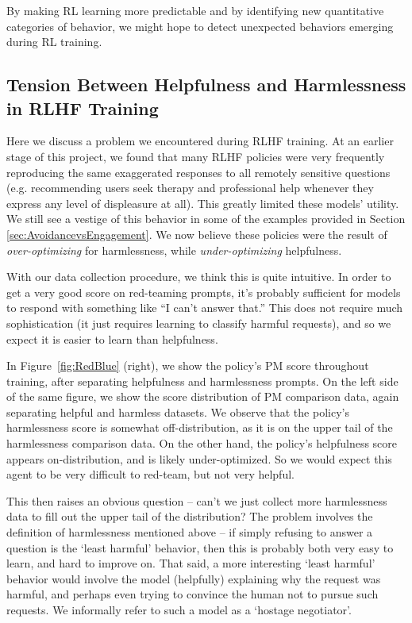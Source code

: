 By making RL learning more predictable and by identifying new quantitative categories of behavior, we might hope to detect unexpected behaviors emerging during RL training.  

\subsection{Tension Between Helpfulness and Harmlessness in RLHF Training}
\label{sec:RedBlue}

Here we discuss a problem we encountered during RLHF training.  At an earlier stage of this project, we found that many RLHF policies were very frequently reproducing the same exaggerated responses to all remotely sensitive questions (e.g. recommending users seek therapy and professional help whenever they express any level of displeasure at all). This greatly limited these models' utility.  We  still see a vestige of this behavior in some of the examples provided in Section \ref{sec:AvoidancevsEngagement}.  We now believe these policies were the result of {\it over-optimizing} for harmlessness, while {\it under-optimizing} helpfulness.  

With our data collection procedure, we think this is quite intuitive.  In order to get a very good score on red-teaming prompts, it's probably sufficient for models to respond with something like ``I can't answer that.'' This does not require much sophistication (it just requires learning to classify harmful requests), and so we expect it is easier to learn than helpfulness.

In Figure~\ref{fig:RedBlue} (right), we show the policy's PM score throughout training, after separating  helpfulness and harmlessness prompts.  On the left side of the same figure, we show the score distribution of PM comparison data, again separating helpful and harmless datasets.  We observe that the policy's harmlessness score is somewhat off-distribution, as it is on the upper tail of the harmlessness comparison data.   On the other hand, the policy's helpfulness score appears on-distribution, and is likely under-optimized.  So we would expect this agent to be very difficult to red-team, but not very helpful.

This then raises an obvious  question -- can't we just collect more harmlessness data to fill out the upper tail of the distribution?  The problem involves the definition of harmlessness mentioned above -- if simply refusing to answer a question is the `least harmful' behavior, then this is probably both very easy to learn, and hard to improve on.  That said, a more interesting `least harmful' behavior would involve the model (helpfully) explaining why the request was harmful, and perhaps even trying to convince the human not to pursue such requests.  We informally refer to such a model as a `hostage negotiator'.

